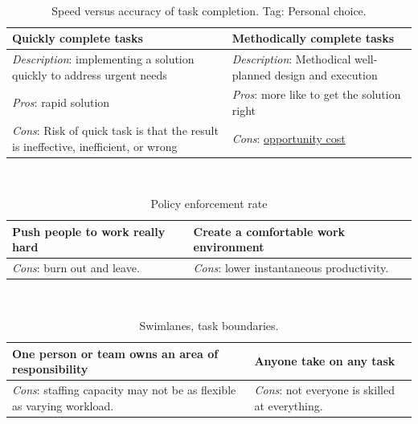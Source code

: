 \ \\

\begin{center}
\begin{table}[ht]
\begin{tabular}{ | m{\dilemmatablewidth}| m{\dilemmatablewidth} | } 
  \hline
  \textbf{Quickly complete tasks} & 
  \textbf{Methodically complete tasks} \\ 
  \hline
  \textit{Description}: implementing a solution quickly to address urgent needs &
  \textit{Description}: Methodical well-planned design and execution \\
  \hline
  \textit{Pros}: rapid solution &
  \textit{Pros}: more like to get the solution right \\
  \hline
  \textit{Cons}: Risk of quick task is that the result is ineffective, inefficient, or wrong &
  \textit{Cons}: \href{https://en.wikipedia.org/wiki/Opportunity_cost}{opportunity cost} \\  
  \hline
\end{tabular}
\caption{Speed versus accuracy of task completion.
{\tiny Tag: Personal choice.}
}
\end{table}
\end{center}

\ \\

\begin{center}
\begin{table}[ht]
\begin{tabular}{ | m{\dilemmatablewidth}| m{\dilemmatablewidth} | } 
  \hline
  \textbf{Push people to work really hard} & 
  \textbf{Create a comfortable work environment} \\ 
  \hline
  \textit{Cons}: burn out and leave. & 
  \textit{Cons}: lower instantaneous productivity. \\  
  \hline
\end{tabular}
\caption{Policy enforcement rate
}
\end{table}
\end{center}

\ \\

\begin{center}
\begin{table}[ht]
\begin{tabular}{ | m{\dilemmatablewidth}| m{\dilemmatablewidth} | } 
  \hline
  \textbf{One person or team owns an area of responsibility} & 
  \textbf{Anyone take on any task} \\ 
  \hline
  \textit{Cons}: staffing capacity may not be as flexible as varying workload. & 
  \textit{Cons}: not everyone is skilled at everything. \\  
  \hline
\end{tabular}
\caption{Swimlanes, task boundaries.
}
\end{table}
\end{center}

